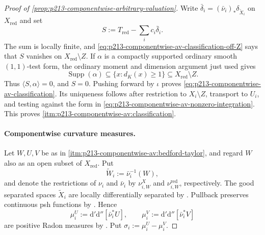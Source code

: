 \begin{proof}[Proof of
\cref{prop:p213-componentwise-arbitrary-valuation}]
Write $\bar\delta_i=(\bar\nu_i)_*\delta_{\widetilde X_i}$ on
$X_{\mathrm{red}}$ and set
\[
                         S:=T_{\mathrm{red}}-\sum_i c_i\bar\delta_i.
\]
The sum is locally finite, and
\eqref{eq:p213-componentwise-av-classification-off-Z} says that $S$
vanishes on $X_{\mathrm{red}}\setminus Z$.  If $\alpha$ is a compactly
supported ordinary smooth $(1,1)$-test form, the ordinary moment and
dimension argument just used gives
\[
 \operatorname{Supp}(\alpha)
    \subseteq\{x:d_K(x)\geq1\}
    \subseteq X_{\mathrm{red}}\setminus Z.
\]
Thus $\langle S,\alpha\rangle=0$, and $S=0$.  Pushing forward by $\iota$
proves \eqref{eq:p213-componentwise-av-classification}.  Its uniqueness
follows after restriction to $X_i\setminus Z$, transport to $U_i$, and
testing against the form in
\eqref{eq:p213-componentwise-av-nonzero-integration}.  This proves
\cref{itm:p213-componentwise-av:classification}.

\paragraph{Componentwise curvature measures.}
Let $W,U,V$ be as in
\cref{itm:p213-componentwise-av:bedford-taylor}, and regard $W$ also as an
open subset of $X_{\mathrm{red}}$.  Put
\[
             \widetilde W_i:=\bar\nu_i^{-1}(W),
\]
and denote the restrictions of $\nu_i$ and $\bar\nu_i$ by
$\nu_{i,W}^X$ and $\nu_{i,W}^{\mathrm{red}}$, respectively.  The good
separated spaces $\widetilde X_i$ are locally differentially separated by
\cite[\S15.2.2 and Corollary~15.2.4]{CLD25}.  Pullback preserves continuous
psh functions by \cite[Proposition~8.1.5]{CLD25}.  Hence
\begin{equation}
 \label{eq:p213-componentwise-av-measures}
 \mu_i^U:=\mathrm d'\mathrm d''[\bar\nu_i^*U],
 \qquad
 \mu_i^V:=\mathrm d'\mathrm d''[\bar\nu_i^*V]
\end{equation}
are positive Radon measures by \cite[Lemma~8.5.5]{CLD25}.  Put
$\sigma_i:=\mu_i^U-\mu_i^V$.


\end{proof}
